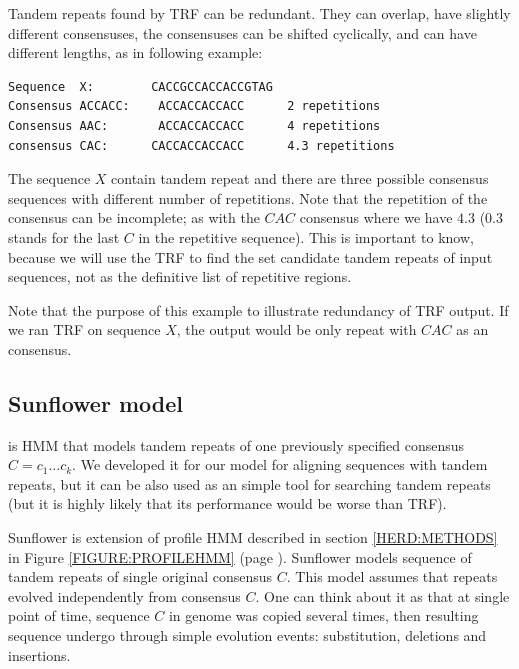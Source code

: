 Tandem repeats found by TRF can be redundant.  They can overlap, have slightly
different consensuses, the consensuses can be shifted cyclically, and can have
different lengths, as in following example:

\begin{verbatim}
Sequence  X:        CACCGCCACCACCGTAG
Consensus ACCACC:    ACCACCACCACC      2 repetitions
Consensus AAC:       ACCACCACCACC      4 repetitions
consensus CAC:      CACCACCACCACC      4.3 repetitions
\end{verbatim}

The sequence $X$ contain tandem repeat and there are three possible consensus
sequences with different number of repetitions. Note that the repetition of the
consensus can be incomplete; as with the $CAC$ consensus where we have $4.3$
($0.3$ stands for the last $C$ in the repetitive sequence). This is important
to know, because we will use the TRF to find the set candidate tandem repeats
of input sequences, not as the definitive list of repetitive regions.

Note that the purpose of this example to illustrate redundancy of TRF output.
If we ran TRF on sequence $X$, the output would be only repeat with $CAC$ as an
consensus.

\subsection{Sunflower model}
 is HMM that models tandem repeats of one
previously specified consensus $C=c_1\dots c_k$. We developed it for our model
for aligning sequences with tandem repeats, but it can be also used as an
simple tool for searching tandem repeats (but it is highly likely that its
performance would be worse than TRF).

Sunflower is extension of profile HMM described in section \ref{HERD:METHODS}
in Figure \ref{FIGURE:PROFILEHMM} (page \pageref{FIGURE:PROFILEHMM}). Sunflower
models sequence of tandem repeats of single original consensus $C$. This model
assumes that repeats evolved independently from consensus $C$. One can think
about it as that at single point of time, sequence $C$ in genome was copied
several times, then resulting sequence undergo through simple evolution events:
substitution, deletions and insertions.

